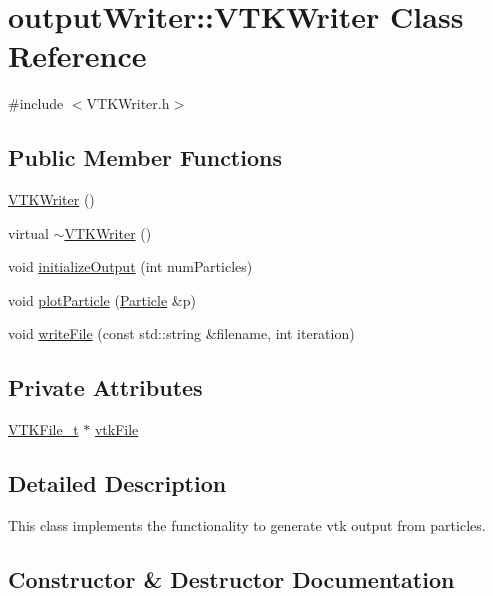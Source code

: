 \hypertarget{classoutputWriter_1_1VTKWriter}{}\section{output\+Writer\+:\+:V\+T\+K\+Writer Class Reference}
\label{classoutputWriter_1_1VTKWriter}


{\ttfamily \#include $<$V\+T\+K\+Writer.\+h$>$}

\subsection*{Public Member Functions}
\begin{DoxyCompactItemize}
\item 
\hyperlink{classoutputWriter_1_1VTKWriter_a448311c322544e40c6e0a3c158924583}{V\+T\+K\+Writer} ()
\item 
virtual \hyperlink{classoutputWriter_1_1VTKWriter_a196a54bcfa3f93638ef292c386f91b61}{$\sim$\+V\+T\+K\+Writer} ()
\item 
void \hyperlink{classoutputWriter_1_1VTKWriter_a41cfcefce4d7eb434f1dd45f5aeb3e8f}{initialize\+Output} (int num\+Particles)
\item 
void \hyperlink{classoutputWriter_1_1VTKWriter_a6d3f50ca3ae2390055d3f9cc0ed1eb4d}{plot\+Particle} (\hyperlink{classParticle}{Particle} \&p)
\item 
void \hyperlink{classoutputWriter_1_1VTKWriter_ad0d7afb78a2027d05e9a03acde3799dd}{write\+File} (const std\+::string \&filename, int iteration)
\end{DoxyCompactItemize}
\subsection*{Private Attributes}
\begin{DoxyCompactItemize}
\item 
\hyperlink{classVTKFile__t}{V\+T\+K\+File\+\_\+t} $\ast$ \hyperlink{classoutputWriter_1_1VTKWriter_ab654ea4308b92e5dbdcd9a6833d5ed30}{vtk\+File}
\end{DoxyCompactItemize}


\subsection{Detailed Description}
This class implements the functionality to generate vtk output from particles. 

\subsection{Constructor \& Destructor Documentation}
\hypertarget{classoutputWriter_1_1VTKWriter_a448311c322544e40c6e0a3c158924583}{}
